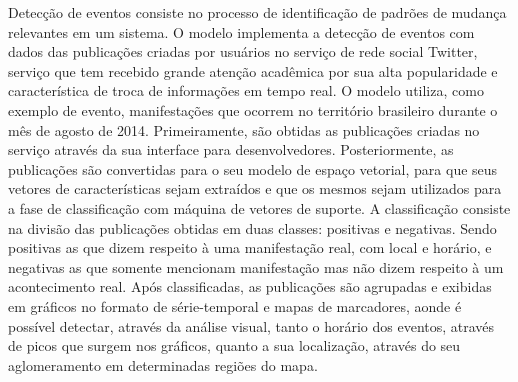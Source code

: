  
\begin{resumo}

Detecção de eventos consiste no processo de identificação de padrões de mudança relevantes em um sistema. O modelo implementa a detecção de eventos com dados das publicações criadas por usuários no serviço de rede social Twitter, serviço que tem recebido grande atenção acadêmica por sua alta popularidade e característica de troca de informações em tempo real. O modelo utiliza, como exemplo de evento, manifestações que ocorrem no território brasileiro durante o mês de agosto de 2014. Primeiramente, são obtidas as publicações criadas no serviço através da sua interface para desenvolvedores. Posteriormente, as publicações são convertidas para o seu modelo de espaço vetorial, para que seus vetores de características sejam extraídos e que os mesmos sejam utilizados para a fase de classificação com máquina de vetores de suporte. A classificação consiste na divisão das publicações obtidas em duas classes: positivas e negativas. Sendo positivas as que dizem respeito à uma manifestação real, com local e horário, e negativas as que somente mencionam manifestação mas não dizem respeito à um acontecimento real. Após classificadas, as publicações são agrupadas e exibidas em gráficos no formato de série-temporal e mapas de marcadores, aonde é possível detectar, através da análise visual, tanto o horário dos eventos, através de picos que surgem nos gráficos, quanto a sua localização, através do seu aglomeramento em determinadas regiões do mapa.

\end{resumo}